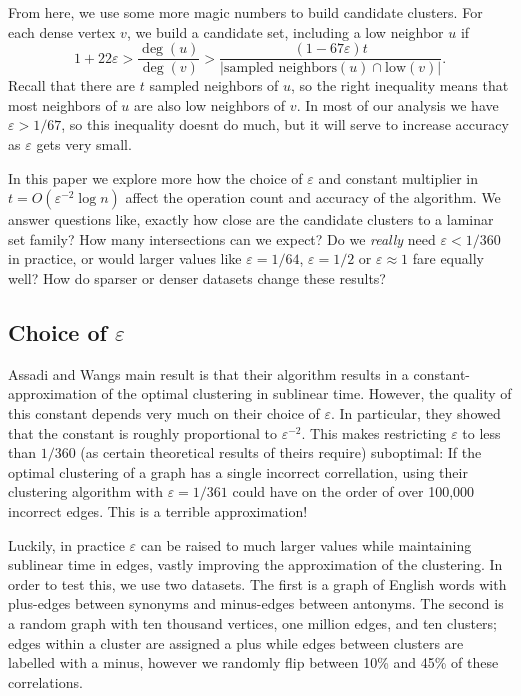 \documentclass[
]{article}
\begin{document}
From here, we use some more magic numbers to build candidate clusters.
For each dense vertex {\(v\)}, we build a candidate set, including a low
neighbor {\(u\)} if
{\[1 + 22\varepsilon > \frac{\deg(u)}{\deg(v)} > \frac{(1 - 67\varepsilon)t}{|\text{sampled\ neighbors}(u) \cap \text{low}(v)|}.\]}Recall
that there are {\(t\)} sampled neighbors of {\(u\)}, so the right
inequality means that most neighbors of {\(u\)} are also low neighbors
of {\(v\)}. In most of our analysis we have {\(\varepsilon > 1/67\)}, so
this inequality doesn\textquotesingle t do much, but it will serve to
increase accuracy as {\(\varepsilon\)} gets very small.

In this paper we explore more how the choice of {\(\varepsilon\)} and
constant multiplier in {\(t = O(\varepsilon^{- 2}\log n)\)} affect the
operation count and accuracy of the algorithm. We answer questions like,
exactly how close are the candidate clusters to a laminar set family?
How many intersections can we expect? Do we \emph{really} need
{\(\varepsilon < 1/360\)} in practice, or would larger values like
{\(\varepsilon = 1/64\)}, {\(\varepsilon = 1/2\)} or
{\(\varepsilon \approx 1\)} fare equally well? How do sparser or denser
datasets change these results?

\hypertarget{choice-of-varepsilon}{%
\subsection{\texorpdfstring{Choice of
{\(\varepsilon\)}}{Choice of \textbackslash varepsilon}}\label{choice-of-varepsilon}}

Assadi and Wang\textquotesingle s main result is that their algorithm
results in a constant-approximation of the optimal clustering in
sublinear time. However, the quality of this constant depends very much
on their choice of {\(\varepsilon\)}. In particular, they showed that
the constant is roughly proportional to {\(\varepsilon^{- 2}\)}. This
makes restricting {\(\varepsilon\)} to less than {\(1/360\)} (as certain
theoretical results of theirs require) suboptimal: If the optimal
clustering of a graph has a single incorrect correllation, using their
clustering algorithm with {\(\varepsilon = 1/361\)} could have on the
order of over 100,000 incorrect edges. This is a terrible approximation!

Luckily, in practice {\(\varepsilon\)} can be raised to much larger
values while maintaining sublinear time in edges, vastly improving the
approximation of the clustering. In order to test this, we use two
datasets. The first is a graph of English words with plus-edges between
synonyms and minus-edges between antonyms. The second is a random graph
with ten thousand vertices, one million edges, and ten clusters; edges
within a cluster are assigned a plus while edges between clusters are
labelled with a minus, however we randomly flip between 10\% and 45\% of
these correlations.
\end{document}
